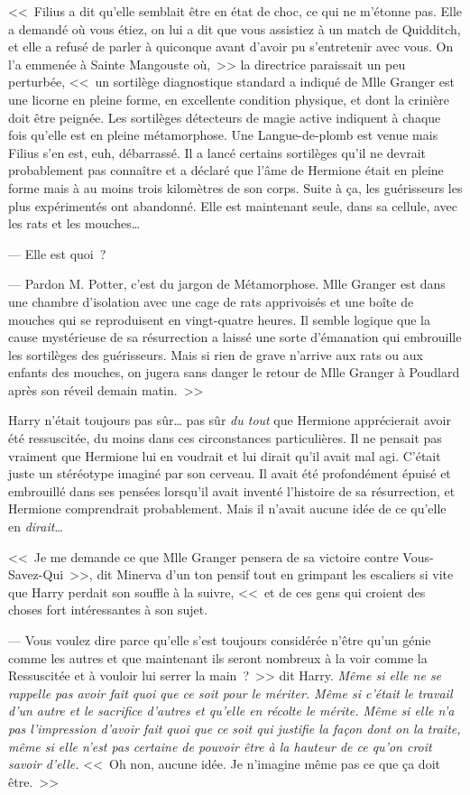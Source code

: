 <<~Filius a dit qu'elle semblait être en état de choc, ce qui ne m'étonne pas. Elle a demandé où vous étiez, on lui a dit que vous assistiez à un match de Quidditch, et elle a refusé de parler à quiconque avant d'avoir pu s'entretenir avec vous. On l'a emmenée à Sainte Mangouste où,~>> la directrice paraissait un peu perturbée, <<~un sortilège diagnostique standard a indiqué de Mlle Granger est une licorne en pleine forme, en excellente condition physique, et dont la crinière doit être peignée. Les sortilèges détecteurs de magie active indiquent à chaque fois qu'elle est en pleine métamorphose. Une Langue-de-plomb est venue mais Filius s'en est, euh, débarrassé. Il a lancé certains sortilèges qu'il ne devrait probablement pas connaître et a déclaré que l'âme de Hermione était en pleine forme mais à au moins trois kilomètres de son corps. Suite à ça, les guérisseurs les plus expérimentés ont abandonné. Elle est maintenant seule, dans sa cellule, avec les rats et les mouches…

--- Elle est quoi~?

--- Pardon M. Potter, c'est du jargon de Métamorphose. Mlle Granger est dans une chambre d'isolation avec une cage de rats apprivoisés et une boîte de mouches qui se reproduisent en vingt-quatre heures. Il semble logique que la cause mystérieuse de sa résurrection a laissé une sorte d'émanation qui embrouille les sortilèges des guérisseurs. Mais si rien de grave n'arrive aux rats ou aux enfants des mouches, on jugera sans danger le retour de Mlle Granger à Poudlard après son réveil demain matin.~>>

Harry n'était toujours pas sûr… pas sûr \emph{du tout} que Hermione apprécierait avoir été ressuscitée, du moins dans ces circonstances particulières. Il ne pensait pas vraiment que Hermione lui en voudrait et lui dirait qu'il avait mal agi. C'était juste un stéréotype imaginé par son cerveau. Il avait été profondément épuisé et embrouillé dans ses pensées lorsqu'il avait inventé l'histoire de sa résurrection, et Hermione comprendrait probablement. Mais il n'avait aucune idée de ce qu'elle en \emph{dirait}…

<<~Je me demande ce que Mlle Granger pensera de sa victoire contre Vous-Savez-Qui~>>, dit Minerva d'un ton pensif tout en grimpant les escaliers si vite que Harry perdait son souffle à la suivre, <<~et de ces gens qui croient des choses fort intéressantes à son sujet.

--- Vous voulez dire parce qu'elle s'est toujours considérée n'être qu'un génie comme les autres et que maintenant ils seront nombreux à la voir comme la Ressuscitée et à vouloir lui serrer la main~?~>> dit Harry. \emph{Même si elle ne se rappelle pas avoir fait quoi que ce soit pour le mériter. Même si c'était le travail d'un autre et le sacrifice d'autres et qu'elle en récolte le mérite. Même si elle n'a pas l'impression d'avoir fait quoi que ce soit qui justifie la façon dont on la traite, même si elle n'est pas certaine de pouvoir être à la hauteur de ce qu'on croit savoir d'elle.} <<~Oh non, aucune idée. Je n'imagine même pas ce que ça doit être.~>>

